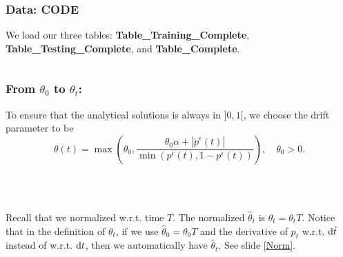 \documentclass[aspectratio=169]{beamer}\usepackage[utf8]{inputenc}
\begin{document}
\begin{frame}\frametitle{Data: CODE}

We load our three tables: \textbf{Table\_Training\_Complete}, \textbf{Table\_Testing\_Complete}, and \textbf{Table\_Complete}.

\begin{center}
\begin{tabular}{|c|}
\toprule
{\tiny

}\\
\bottomrule
\end{tabular}
\end{center}

\end{frame}


\begin{frame}\frametitle{From $\theta_0$ to $\theta_t$:}

To ensure that the analytical solutions is always in $]0,1[$, we choose the drift parameter to be
\begin{equation*}
\theta(t) = \max\left(\theta_0,\frac{\theta_0\alpha+|\dot{p}^\epsilon(t)|}{\min(p^\epsilon(t),1-p^\epsilon(t))}\right),\quad\theta_0>0.
\end{equation*}
\quad\\
\quad\\
\begin{center}
\begin{tabular}{|c|}
\toprule
{\tiny

}\\
\bottomrule
\end{tabular}
\end{center}
{\tiny Recall that we normalized w.r.t. time $T$. The normalized $\hat{\theta}_t$ is $\hat{\theta}_t=\theta_tT$. Notice that in the definition of $\theta_t$, if we use $\hat{\theta}_0=\theta_0T$ and the derivative of $p_t$ w.r.t. $\dif \hat{t}$ instead of w.r.t. $\dif t$, then we automatically have $\hat{\theta}_t$. See slide \ref{Norm}.}

\end{frame}
\end{document}

